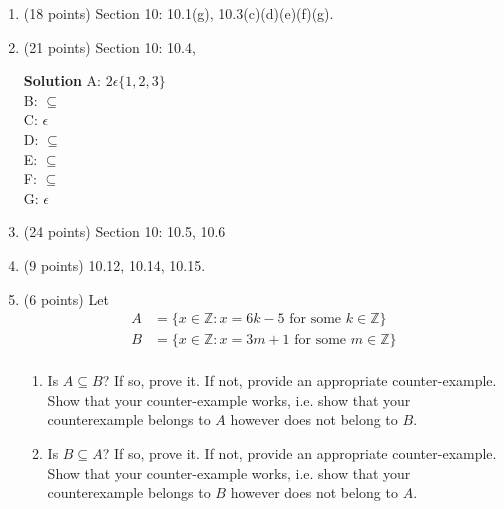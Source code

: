 \documentclass[12pt]{article}
\begin{document}
\begin{enumerate}
    
    
    \item (18 points) Section 10:  10.1(g), 10.3(c)(d)(e)(f)(g).  
    
    
    
    
    \item (21 points) Section 10: 10.4, 
    
    \textbf{Solution} 
     \noindent A: $2 \epsilon \{1,2,3\}$ \\
     \noindent B: $\subseteq$ \\
     \noindent C: $\epsilon$ \\ 
     \noindent D: $\subseteq$ \\ 
     \noindent E: $\subseteq$ \\
     \noindent F: $\subseteq$ \\
     \noindent G: $\epsilon$ \\
    
    
    
    
    \item (24 points) Section 10: 10.5, 10.6
    \item (9 points) 10.12, 10.14, 10.15.  
    \item (6 points)  Let 
    \[    
    \begin{aligned}
    A &= \{ x \in \mathbb{Z}: x = 6k -5 \mbox{ for some } k \in \mathbb{Z} \} \\
    B &= \{ x \in \mathbb{Z}: x = 3m + 1 \mbox{ for some } m \in \mathbb{Z} \} \\
    \end{aligned}
    \]
    \begin{enumerate}
        \item Is $A \subseteq B$?  If so, prove it.  If not, provide an appropriate counter-example.  Show that your counter-example works, i.e. show that your counterexample belongs to $A$ however does not belong to $B$.  
        \item  Is $B \subseteq A$?  If so, prove it.  If not, provide an appropriate counter-example.  Show that your counter-example works, i.e. show that your counterexample belongs to $B$ however does not belong to $A$.  
    \end{enumerate}
    \end{enumerate}
\end{document}
